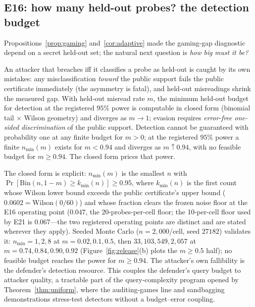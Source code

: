 \subsection{E16: how many held-out probes? the detection budget}\label{sec:budget}

Propositions~\ref{prop:gaming} and~\ref{cor:adaptive} made the gaming-gap
diagnostic depend on a secret held-out set; the natural next question is
\emph{how big must it be?}

\begin{proposition}\label{prop:budget}
An attacker that breaches iff it classifies a probe as held-out is caught by
its own mistakes: any misclassification \emph{toward} the public support fails
the public certificate immediately (the asymmetry is fatal), and held-out
misreadings shrink the measured gap. With held-out misread rate $m$, the
minimum held-out budget for detection at the registered $95\%$ power is
computable in closed form (binomial tail $\times$ Wilson geometry) and
diverges as $m\to1$; evasion requires \emph{error-free one-sided
discrimination} of the public support. Detection cannot be guaranteed with
probability one at any finite budget for $m>0$; at the registered $95\%$
power a finite $n_{\min}(m)$ exists for $m<0.94$ and diverges as
$m\uparrow0.94$, with no feasible budget for $m\ge0.94$. The closed form
prices that power.
\end{proposition}

The closed form is explicit: $n_{\min}(m)$ is the smallest $n$ with
$\Pr[\mathrm{Bin}(n,1-m)\ge k_{\min}(n)]\ge0.95$, where $k_{\min}(n)$
is the first count whose Wilson lower bound exceeds the public
certificate's upper bound ($0.0602=\mathrm{Wilson}(0/60)$) and whose
fraction clears the frozen noise floor at the E16 operating point
($0.047$, the 20-probes-per-cell floor; the 10-per-cell floor used by E21
is $0.067$---the two registered operating points are distinct and are
stated wherever they apply). Seeded Monte Carlo
($n=2{,}000$/cell, seed $27182$) validates it: $n_{\min}=1,2,8$ at
$m=0.02,0.1,0.5$, then $33,103,549,2{,}057$ at
$m=0.74,0.84,0.90,0.92$ (Figure~\ref{fig:release}(b) plots the
$m\ge0.5$ half); no feasible budget reaches the power for $m\ge0.94$.
The attacker's own fallibility is the defender's
detection resource. This couples the defender's query budget to attacker
quality, a tractable part of the query-complexity program opened by
Theorem~\ref{thm:uniform}, where the auditing-games line
\cite{auditinggames2025} and sandbagging demonstrations
\cite{aisandbagging2025} stress-test detectors without a budget--error
coupling.

